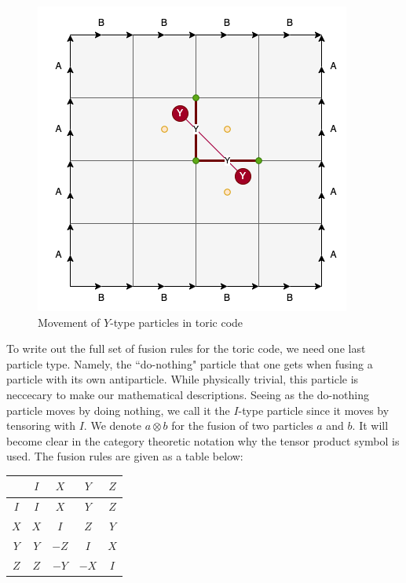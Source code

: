 \documentclass{article}
\theoremstyle{definition}
\numberwithin{figure}{section}
\begin{document}
\begin{enumerate}[\thesection .1.]
\begin{figure}
\begin{center}
\includegraphics[scale=0.30]{Y-type}
\caption{Movement of $Y$-type particles in toric code}
\label{fig:Y-type}
\end{center}
\end{figure}

To write out the full set of fusion rules for the toric code, we need one last particle type. Namely, the ``do-nothing" particle that one gets when fusing a particle with its own antiparticle. While physically trivial, this particle is neccecary to make our mathematical descriptions. Seeing as the do-nothing particle moves by doing nothing, we call it the $I$-type particle since it moves by tensoring with $I$. We denote $a\otimes b$ for the fusion of two particles $a$ and $b$. It will become clear in the category theoretic notation why the tensor product symbol is used. The fusion rules are given as a table below:

\begin{center}
\begin{tabular}{c |c |c |c |c} 
  & $I$ & $X$ & $Y$ & $Z$ \\ [0.5ex] 
 \hline
 $I$ & $I$ & $X$ & $Y$ & $Z$ \\ 
 \hline
 $X$ & $X$ & $I$ & $Z$ & $Y$ \\
 \hline
 $Y$ & $Y$ & $-Z$ & $I$ & $X$ \\
 \hline
 $Z$ & $Z$ & $-Y$ & $-X$ & $I$
\end{tabular}
\end{center}


\end{enumerate}
\end{document}
